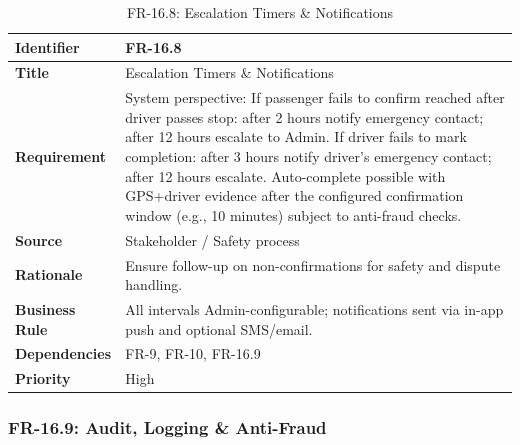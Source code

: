 \begin{longtable}{|p{3cm}|p{12cm}|}

\caption{FR-16.8: Escalation Timers \& Notifications}

\label{tab:fr-16-8} \\

\hline

\rowcolor{lightgray!30}

\textbf{Identifier} & FR-16.8 \\

\hline

\textbf{Title} & Escalation Timers \& Notifications \\

\hline

\textbf{Requirement} & System perspective: If passenger fails to confirm reached after driver passes stop: after 2 hours notify emergency contact; after 12 hours escalate to Admin. If driver fails to mark completion: after 3 hours notify driver's emergency contact; after 12 hours escalate. Auto-complete possible with GPS+driver evidence after the configured confirmation window (e.g., 10 minutes) subject to anti-fraud checks. \\

\hline

\textbf{Source} & Stakeholder / Safety process \\

\hline

\textbf{Rationale} & Ensure follow-up on non-confirmations for safety and dispute handling. \\

\hline

\textbf{Business Rule} & All intervals Admin-configurable; notifications sent via in-app push and optional SMS/email. \\

\hline

\textbf{Dependencies} & FR-9, FR-10, FR-16.9 \\

\hline

\textbf{Priority} & High \\

\hline

\end{longtable}




\subsubsection{FR-16.9: Audit, Logging \& Anti-Fraud}

